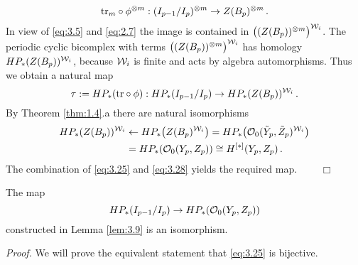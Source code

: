 \[
\mathrm{tr}_m \circ \phi^{\otimes m} : (I_{p-1}/I_p )^{\otimes m} \to Z(B_p )^{\otimes m} \,.
\]
In view of \eqref{eq:3.5} and \eqref{eq:2.7} the image is contained in 
$\big( ( Z(B_p ) )^{\otimes m} \big)^{\mathcal W_i}$. The periodic cyclic bicomplex 
\cite[Section 5.1]{Lod} with terms $\big( ( Z(B_p ) )^{\otimes m} \big)^{\mathcal W_i}$ 
has homology $HP_* (Z(B_p ))^{\mathcal W_i}$, because $\mathcal W_i$ is finite and 
acts by algebra automorphisms. Thus we obtain a natural map
\begin{equation}\label{eq:3.25}
\tau := HP_* (\mathrm{tr} \circ \phi ) : HP_* (I_{p-1}/I_p ) \to HP_* (Z(B_p ))^{\mathcal W_i} \,.
\end{equation}
By Theorem \ref{thm:1.4}.a there are natural isomorphisms
\begin{equation}\label{eq:3.28}
\begin{split}
HP_* (Z(B_p ))^{\mathcal W_i} & \leftarrow HP_* \big( Z(B_p )^{\mathcal W_i} \big) = 
HP_* \big(  \mathcal O_0 (\tilde Y_p ,\tilde Z_p )^{\mathcal W_i} \big) \\
& = HP_* (\mathcal O_0 (Y_p ,Z_p )) \cong H^{[*]}(Y_p ,Z_p) \,.
\end{split}
\end{equation}
The combination of \eqref{eq:3.25} and \eqref{eq:3.28} yields the required map. 
$\qquad \Box$ 
\\[2mm]
\begin{lem}\label{lem:3.10}
The map 
\[
HP_* (I_{p-1} /I_p ) \to HP_* (\mathcal O_0 (Y_p ,Z_p ))
\]
constructed in Lemma \textup{\ref{lem:3.9}} is an isomorphism.
\end{lem}
\emph{Proof.} We will prove the equivalent statement that \eqref{eq:3.25} is bijective.

